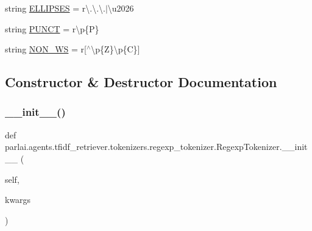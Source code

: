\begin{DoxyCompactItemize}
\item 
string \hyperlink{classparlai_1_1agents_1_1tfidf__retriever_1_1tokenizers_1_1regexp__tokenizer_1_1RegexpTokenizer_add447e9e9c8fcd85a4e1f32b30f8f314}{E\+L\+L\+I\+P\+S\+ES} = r\textquotesingle{}\textbackslash{}.\textbackslash{}.\textbackslash{}.$\vert$\textbackslash{}u2026\textquotesingle{}
\item 
string \hyperlink{classparlai_1_1agents_1_1tfidf__retriever_1_1tokenizers_1_1regexp__tokenizer_1_1RegexpTokenizer_af837a628caa159704dfb2c565d8d378c}{P\+U\+N\+CT} = r\textquotesingle{}\textbackslash{}p\{P\}\textquotesingle{}
\item 
string \hyperlink{classparlai_1_1agents_1_1tfidf__retriever_1_1tokenizers_1_1regexp__tokenizer_1_1RegexpTokenizer_aba405571ab950ec93b3c92f87ff4aa6a}{N\+O\+N\+\_\+\+WS} = r\textquotesingle{}\mbox{[}$^\wedge$\textbackslash{}p\{Z\}\textbackslash{}p\{C\}\mbox{]}\textquotesingle{}
\end{DoxyCompactItemize}


\subsection{Constructor \& Destructor Documentation}
\mbox{\label{classparlai_1_1agents_1_1tfidf__retriever_1_1tokenizers_1_1regexp__tokenizer_1_1RegexpTokenizer_af18fd6e3cb635cf6a05f32b90fb51fcc}} 
\subsubsection{\texorpdfstring{\+\_\+\+\_\+init\+\_\+\+\_\+()}{\_\_init\_\_()}}
{\footnotesize\ttfamily def parlai.\+agents.\+tfidf\+\_\+retriever.\+tokenizers.\+regexp\+\_\+tokenizer.\+Regexp\+Tokenizer.\+\_\+\+\_\+init\+\_\+\+\_\+ (\begin{DoxyParamCaption}\item[{}]{self,  }\item[{}]{kwargs }\end{DoxyParamCaption})}

